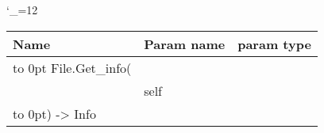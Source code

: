 \begingroup \catcode`\_=12 \tt
\begin{tabular}{lll}
\toprule
\textrm{Name}&\textrm{Param name}&\textrm{param type}\\
\midrule
\hbox to 0pt {File.Get_info(\hss}\\
& self\\
\hbox to 0pt{) -> Info\hss}\\
\bottomrule
\end{tabular}
\endgroup
